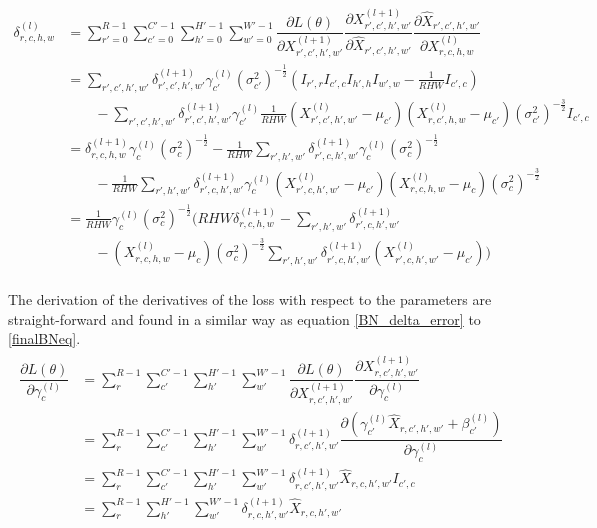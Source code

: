 \documentclass[a4paper, twoside]{article}
\newcommand*{\pd}[2]{\ensuremath{\dfrac{\partial #1}{\partial #2}}}
\begin{document}
\begin{equation}\label{finalBNeq}
\begin{split}
	\delta^{(l)}_{r,c,h,w} 
	& = \sum^{R-1}_{r'=0} \sum^{C'-1}_{c'=0} \sum^{H'-1}_{h'=0} \sum^{W'-1}_{w'=0} \pd{L(\theta)}{X^{(l+1)}_{r',c',h',w'}} \pd{X^{(l+1)}_{r',c',h',w'}}{\hat{X}_{r',c',h',w'}} \pd{\hat{X}_{r',c',h',w'}}{{X}^{(l)}_{r,c,h,w}}\\
	& = \sum\limits_{r',c',h',w'}\delta^{(l+1)}_{r',c',h',w'} \gamma^{(l)}_{c'} {(\sigma^2_{c'})}^{-\frac{1}{2}} (I_{r',r} I_{c',c} I_{h',h} I_{w',w} - \frac{1}{RHW} I_{c',c}) \\
	& \qquad -\sum\limits_{r',c',h',w'}\delta^{(l+1)}_{r',c',h',w'} \gamma^{(l)}_{c'} \frac{1}{RHW} ({X^{(l)}_{r',c',h',w'} - \mu_{c'}})({X^{(l)}_{r,c',h,w} - \mu_{c'}}) {(\sigma^2_{c'})}^{-\frac{3}{2}} I_{c',c} \\
	& = \delta^{(l+1)}_{r,c,h,w} \gamma^{(l)}_{c} {(\sigma^2_{c})}^{-\frac{1}{2}} - \frac{1}{RHW} \sum\limits_{r',h',w'} \delta^{(l+1)}_{r',c,h',w'} \gamma^{(l)}_{c} {(\sigma^2_{c})}^{-\frac{1}{2}}\\
	& \qquad - \frac{1}{RHW} \sum\limits_{r',h',w'} \delta^{(l+1)}_{r',c,h',w'}\gamma^{(l)}_{c} ({X^{(l)}_{r',c,h',w'} - \mu_{c'}})({X^{(l)}_{r,c,h,w} - \mu_{c}}){(\sigma^2_{c})}^{-\frac{3}{2}} \\
	& = \frac{1}{RHW} \gamma^{(l)}_c {(\sigma^2_{c})}^{-\frac{1}{2}} \biggl(    RHW \delta^{(l+1)}_{r,c,h,w} -  \sum\limits_{r',h',w'} \delta^{(l+1)}_{r',c,h',w'} \qquad \\
	& \qquad -  ({X^{(l)}_{r,c,h,w} - \mu_{c}}) {(\sigma^2_{c})}^{-\frac{3}{2}} \sum\limits_{r',h',w'} \delta^{(l+1)}_{r',c,h',w'} ({X^{(l)}_{r',c,h',w'} - \mu_{c'}}) \biggl) \\
\end{split}
\end{equation}

The derivation of the derivatives of the loss with respect to the parameters are straight-forward and found in a similar way as equation \eqref{BN_delta_error} to \eqref{finalBNeq}. \cite{webBN1} \cite{webBN2}
\begin{align}
\begin{split}
	\pd{L(\theta)}{\gamma^{(l)}_{c}}
		& = \sum^{R-1}_{r} \sum^{C'-1}_{c'} \sum^{H'-1}_{h'} \sum^{W'-1}_{w'} \pd{L(\theta)}{X^{(l+1)}_{r,c',h',w'}} \pd{X^{(l+1)}_{r,c',h',w'}}{\gamma^{(l)}_{c}} \\
		& = \sum^{R-1}_{r} \sum^{C'-1}_{c'} \sum^{H'-1}_{h'} \sum^{W'-1}_{w'} \delta^{(l+1)}_{r,c',h',w'}  \pd{({\gamma_{c'}^{(l)} \hat{X}_{r,c',h',w'} + \beta_{c'}^{(l)}})}{\gamma^{(l)}_{c}} \\
		& = \sum^{R-1}_{r} \sum^{C'-1}_{c'} \sum^{H'-1}_{h'} \sum^{W'-1}_{w'} \delta^{(l+1)}_{r,c',h',w'} \hat{X}_{r,c,h',w'} I_{c',c}\\
		& = \sum^{R-1}_{r} \sum^{H'-1}_{h'} \sum^{W'-1}_{w'} \delta^{(l+1)}_{r,c,h',w'} \hat{X}_{r,c,h',w'} \\
\end{split}
\end{align}
\end{document}
